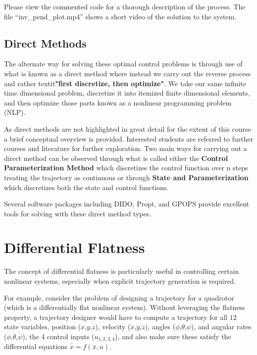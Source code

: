 ﻿\documentclass[twoside]{article}
\begin{document}
Please view the commented code for a thorough description of the process. The file ``inv\_pend\_plot.mp4'' shows a short video of the solution to the system.



\subsection{Direct Methods}
The alternate way for solving these optimal control problems is through use of what is known as a direct method where instead we carry out the reverse process and rather textit{\textbf{"first discretize, then optimize"}}. We take our same infinite time dimensional problem, discretize it into itemized finite dimensional elements, and then optimize those parts known as a nonlinear programming problem (NLP).

As direct methods are not highlighted in great detail for the extent of this course a brief conceptual overview is provided. Interested students are referred to further courses and literature for further exploration. Two main ways for carrying out a direct method can be observed through what is called either the \textbf{Control Parameterization Method} which discretizes the control function over n steps treating the trajectory as continuous or through \textbf{State and Parameterization} which discretizes both the state and control functions.

Several software packages including DIDO, Propt, and GPOPS provide excellent tools for solving with these direct method types.

\section{Differential Flatness}
The concept of differential flatness is particularly useful in controlling certain nonlinear systems, especially when explicit trajectory generation is required.

For example, consider the problem of designing a trajectory for a quadrotor (which is a differentially flat nonlinear system). Without leveraging the flatness property, a trajectory designer would have to compute a trajectory for all $12$ state variables, position ($x$,$y$,$z$), velocity ($\dot{x}$,$\dot{y}$,$\dot{z}$), angles ($\phi$,$\theta$,$\psi$), and angular rates ($\dot{\phi}$,$\dot{\theta}$,$\dot{\psi}$), the 4 control inputs ($u_{1,2,3,4}$), and also make sure these satisfy the differential equations $\bar{\dot{x}} = f(\bar{x},u)$.
\end{document}
